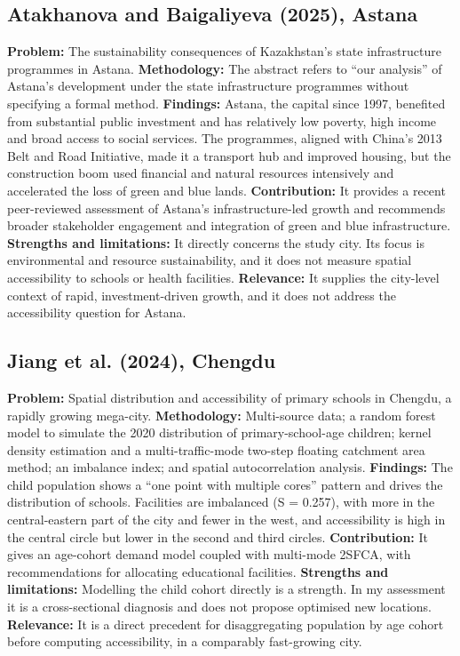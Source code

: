 \documentclass[journal]{IEEEtran}
\begin{document}
\subsection{Atakhanova and Baigaliyeva (2025), Astana \cite{astana2025}}
\textbf{Problem:} The sustainability consequences of Kazakhstan's state infrastructure programmes in Astana.
\textbf{Methodology:} The abstract refers to ``our analysis'' of Astana's development under the state infrastructure programmes without specifying a formal method.
\textbf{Findings:} Astana, the capital since 1997, benefited from substantial public investment and has relatively low poverty, high income and broad access to social services. The programmes, aligned with China's 2013 Belt and Road Initiative, made it a transport hub and improved housing, but the construction boom used financial and natural resources intensively and accelerated the loss of green and blue lands.
\textbf{Contribution:} It provides a recent peer-reviewed assessment of Astana's infrastructure-led growth and recommends broader stakeholder engagement and integration of green and blue infrastructure.
\textbf{Strengths and limitations:} It directly concerns the study city. Its focus is environmental and resource sustainability, and it does not measure spatial accessibility to schools or health facilities.
\textbf{Relevance:} It supplies the city-level context of rapid, investment-driven growth, and it does not address the accessibility question for Astana.

\subsection{Jiang et al. (2024), Chengdu \cite{chengdu2024}}
\textbf{Problem:} Spatial distribution and accessibility of primary schools in Chengdu, a rapidly growing mega-city.
\textbf{Methodology:} Multi-source data; a random forest model to simulate the 2020 distribution of primary-school-age children; kernel density estimation and a multi-traffic-mode two-step floating catchment area method; an imbalance index; and spatial autocorrelation analysis.
\textbf{Findings:} The child population shows a ``one point with multiple cores'' pattern and drives the distribution of schools. Facilities are imbalanced (S = 0.257), with more in the central-eastern part of the city and fewer in the west, and accessibility is high in the central circle but lower in the second and third circles.
\textbf{Contribution:} It gives an age-cohort demand model coupled with multi-mode 2SFCA, with recommendations for allocating educational facilities.
\textbf{Strengths and limitations:} Modelling the child cohort directly is a strength. In my assessment it is a cross-sectional diagnosis and does not propose optimised new locations.
\textbf{Relevance:} It is a direct precedent for disaggregating population by age cohort before computing accessibility, in a comparably fast-growing city.
\end{document}
